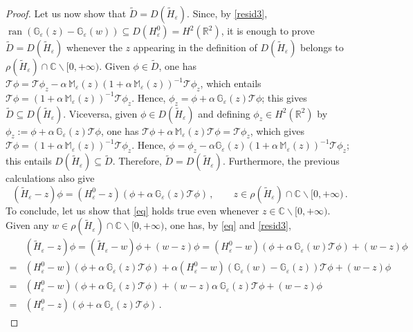 \documentclass[a4paper,11pt,reqno]{amsart}
\theoremstyle{definition}
\numberwithin{equation}{section}
\newcommand{\ran}{\operatorname{ran }}
\newcommand{\CO}{\mathbb C}
\newcommand{\RE}{\mathbb R}
\newcommand{\Gb}{\mathbb G}
\newcommand{\Mb}{\mathbb M}
\newcommand{\Tau}{\mathcal{T}}
\newcommand{\ve}{\varepsilon}
\newcommand{\alve}{\ve}
\newcommand{\be}{\begin{equation}}
\newcommand{\ee}{\end{equation}}
\begin{document}
\begin{proof}
 Let us now show that $\widetilde D=D(\widetilde H_{\alve})$. Since, by 
\eqref{resid3}, $\ran(\Gb_{\ve}(z)-\Gb_{\ve}(w))\subseteq D(H^{0}_{\ve})=H^{2}(\RE^{2})$, it is enough to prove $\widetilde D=D(\widetilde H_{\alve})$ whenever the $z$ appearing in the definition of $D(\widetilde H_{\alve})$ belongs to $ \rho(\widetilde H_{\alve})\cap\CO\backslash[0,+\infty)$. Given $\phi\in \widetilde D$, one has $\Tau\phi=\Tau\phi_{z}-\alpha \,\Mb_{\ve}(z)\left( 1+\alpha  \,\Mb_{\ve}(z)\right)^{-1}  \Tau  \phi_{z}$, which entails $ \Tau\phi=\left( 1+\alpha \,\Mb_{\ve}(z)\right)^{-1}  \Tau  \phi_{z}$. Hence, $\phi_{z}=\phi+\alpha \, \Gb_{\ve}(z)\Tau\phi$; this gives $\widetilde D\subseteq D(\widetilde H_{\alve})$. 
Viceversa, given $\phi\in D(\widetilde H_{\alve})$ and defining $\phi_{z}\in H^{2}(\RE^{2})$ by $\phi_{z}:=\phi+\alpha  \,\Gb_{\ve}(z)\Tau\phi$, one has $\Tau\phi+\alpha \,\Mb_{\ve}(z)\Tau\phi=\Tau\phi_{z}$, which gives $  \Tau\phi=\left( 1+\alpha \, \Mb_{\ve}(z)\right)^{-1}  \Tau  \phi_{z}$. Hence, $\phi=\phi_{z}-\alpha \Gb_{\ve}(z)\left( 1+\alpha \, \Mb_{\ve}(z)\right)^{-1}  \Tau  \phi_{z}$; this entails $D(\widetilde H_{\alve})\subseteq \widetilde D$.
Therefore, $\widetilde D=D(\widetilde H_{\alve})$. Furthermore, the previous calculations also give
\be\label{eq}
(\widetilde H_{\alve} -z  )\phi=(H^{0}_{\ve} -z ) (\phi+\alpha \, \Gb_{\ve}(z)\Tau\phi )\,,\qquad z\in  \rho(\widetilde H_{\alve})\cap\CO\backslash[0,+\infty)\,.
\ee  
To conclude, let us show that \eqref{eq} holds true even whenever $z\in \CO\backslash[0,+\infty)$. Given any $w\in  \rho(\widetilde H_{\alve})\cap\CO\backslash[0,+\infty)$, one has, by \eqref{eq} and \eqref{resid3},
\begin{align*}
&(\widetilde H_{\alve} -z  )\phi=
(\widetilde H_{\alve} -w  )\phi+(w-z)\phi=
(H^{0}_{\ve} -w ) (\phi+\alpha \, \Gb_{\ve}(w)\Tau\phi )+(w-z)\phi\\
=&(H^{0}_{\ve} -w ) (\phi+\alpha \, \Gb_{\ve}(z)\Tau\phi )+
\alpha  (H^{0}_{\ve} -w ) (\Gb_{\ve}(w)-\Gb_{\ve}(z))\Tau\phi +(w-z)\phi\\
=&(H^{0}_{\ve} -w ) (\phi+\alpha \, \Gb_{\ve}(z)\Tau\phi )+(w-z)
\alpha \, \Gb_{\ve}(z)\Tau\phi +(w-z)\phi\\
=&(H^{0}_{\ve} -z ) (\phi+\alpha \, \Gb_{\ve}(z)\Tau\phi )\,.
\end{align*}
\end{proof}
 
\end{document}
